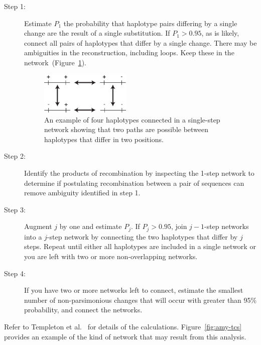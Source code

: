 \documentclass[12pt]{article}
\begin{document}
\begin{description}

\item[Step 1:] Estimate $P_1$ the probability that haplotype pairs
  differing by a single change are the result of a single
  substitution. If $P_1 > 0.95$, as is likely, connect all pairs of
  haplotypes that differ by a single change. There may be ambiguities
  in the reconstruction, including loops. Keep these in the
  network~(Figure~\ref{fig:haplotype-network}).

\begin{figure}
\begin{center}
\includegraphics[width=0.425\textwidth]{haplotype-network.eps}
\end{center}
\caption{An example of four haplotypes connected in a single-step
  network showing that two paths are possible between haplotypes that
  differ in two positions.}\label{fig:haplotype-network}
\end{figure}


\item[Step 2:] Identify the products of recombination by inspecting
  the 1-step network to determine if postulating recombination between
  a pair of sequences can remove ambiguity identified in step 1.

\item[Step 3:] Augment $j$ by one and estimate $P_j$. If $P_j > 0.95$,
  join $j-1$-step networks into a $j$-step network by connecting
  the two haplotypes that differ by $j$ steps. Repeat until either all
  haplotypes are included in a single network or you are left with two
  or more non-overlapping networks.

\item[Step 4:] If you have two or more networks left to connect,
  estimate the smallest number of non-parsimonious changes that will
  occur with greater than 95\% probability, and connect the networks.

\end{description}

\noindent Refer to Templeton et al.~\cite{Templeton-etal-1992} for
details of the calculations. Figure~\ref{fig:amy-tcs} provides an
example of the kind of network that may result from this
analysis.
\end{document}
